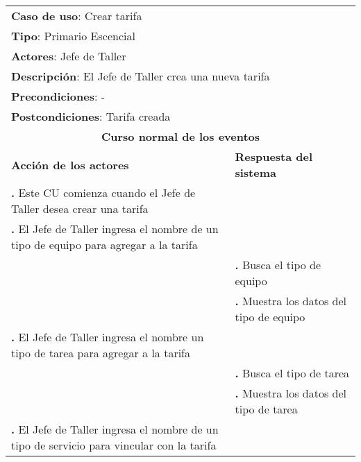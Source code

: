 \documentclass[12pt]{extarticle}
\begin{document}
    \newcommand\inc{\stepcounter{step}\textbf{\thestep. }}
    \newcommand\resetinc{\setcounter{step}{0}}
    \newcommand\raya{\noindent\rule{169mm}{0.8mm}\\}


	\begin{longtable}{ |p{8cm}|p{8cm}| }
		\hline
		\multicolumn{2}{|p{16cm}|}{\textbf{Caso de uso}: Crear tarifa}\\
		\multicolumn{2}{|p{16cm}|}{\textbf{Tipo}: Primario Escencial}\\
		\multicolumn{2}{|p{16cm}|}{\textbf{Actores}: Jefe de Taller}\\
		\multicolumn{2}{|p{16cm}|}{\textbf{Descripción}: El Jefe de Taller crea una nueva tarifa}\\
		\multicolumn{2}{|p{16cm}|}{\textbf{Precondiciones}: -}\\
		\multicolumn{2}{|p{16cm}|}{\textbf{Postcondiciones}: Tarifa creada}\\
		\hline
		\multicolumn{2}{|c|}{\textbf{Curso normal de los eventos}}\\
		\hline
		\textbf{Acción de los actores} & \textbf{Respuesta del sistema}\\
		\hline

			\inc Este CU comienza cuando el Jefe de Taller desea crear una tarifa& \\
			\hline
            \inc El Jefe de Taller ingresa el nombre de un tipo de equipo para agregar a la tarifa & \\
			\hline
            & \inc Busca el tipo de equipo \\
			\hline
			& \inc Muestra los datos del tipo de equipo \\
			\hline


			\inc El Jefe de Taller ingresa el nombre un tipo de tarea para agregar a la tarifa & \\
			\hline
			& \inc Busca el tipo de tarea \\
			\hline
			& \inc Muestra los datos del tipo de tarea \\
			\hline
            \inc El Jefe de Taller ingresa el nombre de un tipo de servicio para vincular con la tarifa &\\
			\hline



\end{longtable}
\end{document}
